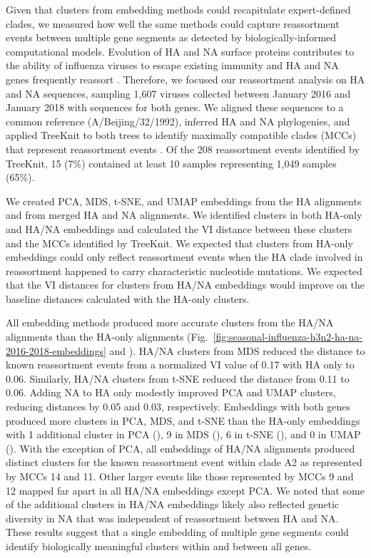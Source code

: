 \documentclass[10pt,letterpaper]{article}
\begin{document}
Given that clusters from embedding methods could recapitulate expert-defined clades, we measured how well the same methods could capture reassortment events between multiple gene segments as detected by biologically-informed computational models.
Evolution of HA and NA surface proteins contributes to the ability of influenza viruses to escape existing immunity \cite{Petrova2018} and HA and NA genes frequently reassort \cite{Nelson2008,Marshall2013,Potter2019}.
Therefore, we focused our reassortment analysis on HA and NA sequences, sampling 1,607 viruses collected between January 2016 and January 2018 with sequences for both genes.
We aligned these sequences to a common reference (A/Beijing/32/1992), inferred HA and NA phylogenies, and applied TreeKnit to both trees to identify maximally compatible clades (MCCs) that represent reassortment events \cite{Barrat-Charlaix2022}.
Of the 208 reassortment events identified by TreeKnit, 15 (7\%) contained at least 10 samples representing 1,049 samples (65\%).

We created PCA, MDS, t-SNE, and UMAP embeddings from the HA alignments and from merged HA and NA alignments.
We identified clusters in both HA-only and HA/NA embeddings and calculated the VI distance between these clusters and the MCCs identified by TreeKnit.
We expected that clusters from HA-only embeddings could only reflect reassortment events when the HA clade involved in reassortment happened to carry characteristic nucleotide mutations.
We expected that the VI distances for clusters from HA/NA embeddings would improve on the baseline distances calculated with the HA-only clusters.

All embedding methods produced more accurate clusters from the HA/NA alignments than the HA-only alignments (Fig.~\ref{fig:seasonal-influenza-h3n2-ha-na-2016-2018-embeddings} and ).
HA/NA clusters from MDS reduced the distance to known reassortment events from a normalized VI value of 0.17 with HA only to 0.06.
Similarly, HA/NA clusters from t-SNE reduced the distance from 0.11 to 0.06.
Adding NA to HA only modestly improved PCA and UMAP clusters, reducing distances by 0.05 and 0.03, respectively.
Embeddings with both genes produced more clusters in PCA, MDS, and t-SNE than the HA-only embeddings with 1 additional cluster in PCA (), 9 in MDS (), 6 in t-SNE (), and 0 in UMAP ().
With the exception of PCA, all embeddings of HA/NA alignments produced distinct clusters for the known reassortment event within clade A2 \cite{Potter2019} as represented by MCCs 14 and 11.
Other larger events like those represented by MCCs 9 and 12 mapped far apart in all HA/NA embeddings except PCA.
We noted that some of the additional clusters in HA/NA embeddings likely also reflected genetic diversity in NA that was independent of reassortment between HA and NA.
These results suggest that a single embedding of multiple gene segments could identify biologically meaningful clusters within and between all genes.
\end{document}
